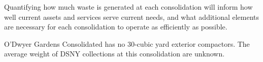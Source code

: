
    Quantifying how much waste is generated at each consolidation will inform how well current assets and services serve current needs, and what additional elements are necessary for each consolidation to operate as efficiently as possible.
    
    O'Dwyer Gardens Consolidated has no 30-cubic yard exterior compactors. The average weight of DSNY collections at this consolidation are unknown.